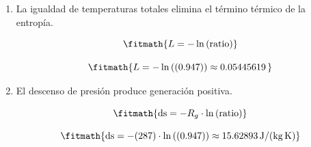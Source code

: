 \begin{enumerate}

\item La igualdad de temperaturas totales elimina el término térmico de la entropía.

\[\fitmath{L=-\ln\left(\mathrm{ratio}\right)}\]

\[\fitmath{L=-\ln\left((0.947)\right)\approx 0.05445619\,}\]

\item El descenso de presión produce generación positiva.

\[\fitmath{\mathrm{ds}=-R_g\cdot \ln\left(\mathrm{ratio}\right)}\]

\[\fitmath{\mathrm{ds}=-(287)\cdot \ln\left((0.947)\right)\approx 15.62893\,\mathrm{J/(kg\,K)}}\]

\end{enumerate}
